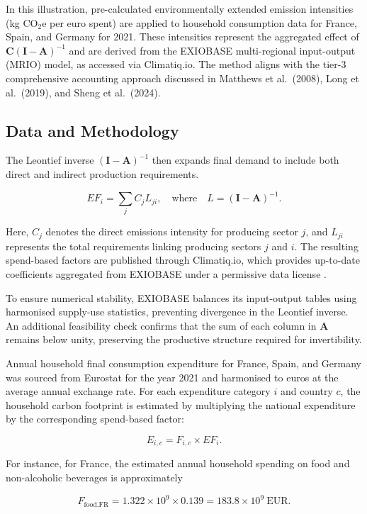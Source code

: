 \documentclass[12pt,a4paper]{article}%
\begin{document}
In this illustration, pre-calculated environmentally extended emission intensities (kg CO$_{2}$e per euro spent) are applied to household consumption data for France, Spain, and Germany for 2021. These intensities represent the aggregated effect of $\mathbf{C} {(\mathbf{I}-\mathbf{A})}^{-1}$ and are derived from the EXIOBASE multi-regional input-output (MRIO) model, as accessed via Climatiq.io. The method aligns with the tier-3 comprehensive accounting approach discussed in Matthews et al.~(2008), Long et al.~(2019), and Sheng et al.~(2024).

\subsection{Data and Methodology}

The Leontief inverse $(\mathbf{I} - \mathbf{A})^{-1}$ then expands final demand to include both direct and indirect production requirements.

\[
EF_i = \sum_{j} C_j L_{ji}, 
\quad \text{where} \quad 
L = {(\mathbf{I} - \mathbf{A})}^{-1}.
\]

Here, $C_j$ denotes the direct emissions intensity for producing sector $j$, and $L_{ji}$ represents the total requirements linking producing sectors $j$ and $i$. The resulting spend-based factors are published through Climatiq.io, which provides up-to-date coefficients aggregated from EXIOBASE under a permissive data license \citep{EXIOBASEsource}.

To ensure numerical stability, EXIOBASE balances its input-output tables using harmonised supply-use statistics, preventing divergence in the Leontief inverse. An additional feasibility check confirms that the sum of each column in $\mathbf{A}$ remains below unity, preserving the productive structure required for invertibility.

Annual household final consumption expenditure for France, Spain, and Germany was sourced from Eurostat for the year 2021 and harmonised to euros at the average annual exchange rate. For each expenditure category $i$ and country $c$, the household carbon footprint is estimated by multiplying the national expenditure by the corresponding spend-based factor:

\[
E_{i,c} = F_{i,c} \times EF_i.
\]

For instance, for France, the estimated annual household spending on food and non-alcoholic beverages is approximately

\[
F_{\text{food,FR}} = 1.322 \times 10^9 \times 0.139 = 183.8 \times 10^9~\text{EUR}.
\]
\end{document}
